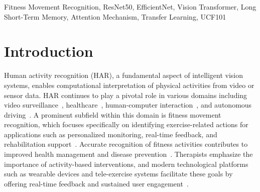 \documentclass[conference]{IEEEtran}
\begin{document}
\begin{abstract}
\end{abstract}

\begin{IEEEkeywords}
Fitness Movement Recognition, ResNet50, EfficientNet, Vision Transformer, Long Short-Term Memory, Attention Mechanism, Transfer Learning, UCF101
\end{IEEEkeywords}


\section{Introduction}
Human activity recognition (HAR), a fundamental aspect of intelligent vision systems, enables computational interpretation of physical activities from video or sensor data. HAR continues to play a pivotal role in various domains including video surveillance~\cite{ref1}, healthcare~\cite{ref2}, human-computer interaction~\cite{ref3}, and autonomous driving~\cite{ref4}. A prominent subfield within this domain is fitness movement recognition, which focuses specifically on identifying exercise-related actions for applications such as personalized monitoring, real-time feedback, and rehabilitation support~\cite{ref5}. Accurate recognition of fitness activities contributes to improved health management and disease prevention~\cite{ref6}. Therapists emphasize the importance of activity-based interventions, and modern technological platforms such as wearable devices and tele-exercise systems facilitate these goals by offering real-time feedback and sustained user engagement~\cite{ref7}.
\end{document}
